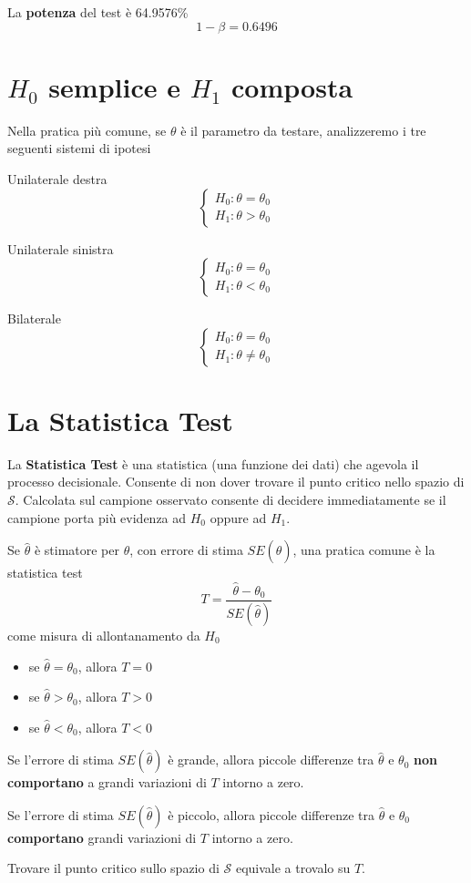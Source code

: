 \documentclass[
  11pt,
]{book}
\providecommand{\tightlist}{%
  \setlength{\itemsep}{0pt}\setlength{\parskip}{0pt}}
\theoremstyle{mytheoremstyle}
\theoremstyle{mydefstyle}
\newenvironment{nota}
  {
\begin{tcolorbox}[enhanced,breakable,arc=0.1mm,boxrule=1pt,colback=white,colframe=iblue,title=\bf \fontfamily{lmss}\selectfont \faInfoCircle \hspace{.5 cm} Nota,drop fuzzy shadow]
}{
\end{tcolorbox}
  }
\begin{document}
La \textbf{potenza} del test è 64.9576\%
\[1-\beta=0.6496\]

\section{\texorpdfstring{\(H_0\) semplice e \(H_1\) composta}{H\_0 semplice e H\_1 composta}}\label{h_0-semplice-e-h_1-composta}

Nella pratica più comune, se \(\theta\) è il parametro da testare,
analizzeremo i tre seguenti sistemi di ipotesi

Unilaterale destra \[\begin{cases}
H_0:\theta=\theta_0\\
H_1:\theta>\theta_0
\end{cases}\]

Unilaterale sinistra \[\begin{cases}
H_0:\theta=\theta_0\\
H_1:\theta<\theta_0
\end{cases}\]

Bilaterale \[\begin{cases}
H_0:\theta=\theta_0\\
H_1:\theta\neq \theta_0
\end{cases}\]

\section{La Statistica Test}\label{la-statistica-test}

La \textbf{Statistica Test} è una statistica (una funzione dei dati) che
agevola il processo decisionale.
Consente di non dover trovare il punto critico nello spazio di
\(\mathcal{S}\).
Calcolata sul campione osservato consente di decidere immediatamente se
il campione porta più evidenza ad \(H_0\) oppure ad \(H_1\).

\begin{nota}
Se \(\hat\theta\) è stimatore per \(\theta\), con errore di stima
\(SE(\hat\theta)\), una pratica comune è la statistica test
\[T=\frac{\hat\theta-\theta_0}{SE(\hat\theta)}\]
come misura di allontanamento da \(H_0\)

\begin{itemize}
\tightlist
\item
  se \(\hat\theta=\theta_0\), allora \(T=0\)
\item
  se \(\hat\theta>\theta_0\), allora \(T>0\)
\item
  se \(\hat\theta<\theta_0\), allora \(T<0\)
\end{itemize}

Se l'errore di stima \(SE(\hat\theta)\) è grande, allora piccole
differenze tra \(\hat\theta\) e \(\theta_0\) \textbf{non comportano} a grandi
variazioni di \(T\) intorno a zero.

Se l'errore di stima \(SE(\hat\theta)\) è piccolo, allora piccole
differenze tra \(\hat\theta\) e \(\theta_0\) \textbf{comportano} grandi
variazioni di \(T\) intorno a zero.

Trovare il punto critico sullo spazio di \(\mathcal{S}\) equivale a
trovalo su \(T\).

\end{nota}
\end{document}
